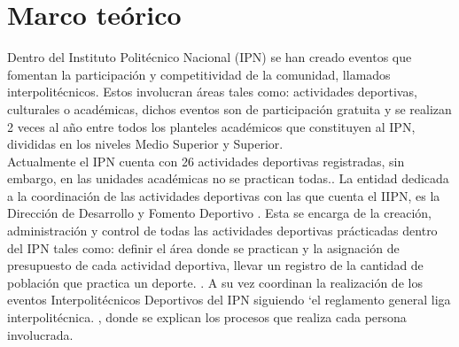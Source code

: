 \chapter{Marco te\'orico}
	
	\noindent Dentro del Instituto Politécnico Nacional (IPN) se han creado eventos que fomentan la participación y competitividad de la comunidad, llamados interpolitécnicos. Estos involucran áreas tales como: actividades deportivas, culturales o académicas, dichos eventos son de participación gratuita y se realizan 2 veces al año entre todos los planteles académicos que constituyen al IPN, divididas en los niveles Medio Superior y Superior.  \cite{Reglas}\\
	\noident Actualmente el IPN cuenta con 26 actividades deportivas registradas, sin embargo, en las unidades académicas no se practican todas.\cite{Reglas}.
	\noident La entidad dedicada a la coordinación de las actividades deportivas con las que cuenta el IIPN, es la Dirección de Desarrollo y Fomento Deportivo \cite{DDYFD}. Esta se encarga de la creación, administración y control de todas las actividades deportivas prácticadas dentro del IPN tales como: definir el área donde se practican y la asignación de presupuesto de cada actividad deportiva, llevar un registro de la cantidad de población que practica un deporte. \cite{Reglamento}.	
	\noident A su vez coordinan la realización de los eventos Interpolitécnicos Deportivos del IPN siguiendo ‘el reglamento general liga interpolitécnica. \cite{Reglamento}, donde se explican los  procesos que realiza cada persona involucrada.
	
